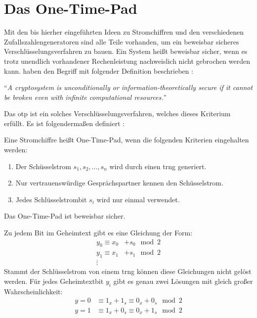\section{Das One-Time-Pad}
Mit den bis hierher eingeführten Ideen zu Stromchiffren und den verschiedenen
Zufallszahlengeneratoren sind alle Teile vorhanden, um ein beweisbar
sicheres Verschlüsselungsver\-fahren zu bauen. Ein System heißt beweisbar sicher,
wenn es trotz unendlich vorhandener Rechenleistung nachweislich nicht gebrochen werden kann.
\citeauthor{BOOK:crypto} haben den Begriff mit folgender Definition
beschrieben \parencite*[36]{BOOK:crypto}:

\begin{definition}
  \enquote{\textit{A cryptosystem is unconditionally or in\-formation-theoretically
      secure if it cannot be broken even with infinite computational resources.}}
\end{definition}

\noindent
Das \ac{otp} ist ein solches Verschlüsselungsverfahren, welches dieses Kriterium
erfüllt. Es ist folgendermaßen definiert \parencite[37]{BOOK:crypto}:

\begin{definition}
  Eine Stromchiffre heißt One-Time-Pad, wenn die folgenden Kriterien eingehalten werden:
  \begin{enumerate}
    \item Der Schüsselstrom $s_1,s_2,\dots,s_n$ wird durch einen \ac{trng} generiert.
    \item Nur vertrauenswürdige Gesprächspartner kennen den Schüsselstrom.
    \item Jedes Schlüsselstrombit $s_i$ wird nur einmal verwendet.
  \end{enumerate}
  Das One-Time-Pad ist beweisbar sicher.
\end{definition}
\noindent
Zu jedem Bit im Geheimtext gibt es eine Gleichung der Form:
\begin{align*}
  y_0   \equiv x_0 & + s_0 \mod{2} \\
  y_1   \equiv x_1 & + s_1 \mod{2} \\
  \vdots           &
\end{align*}
\noindent
Stammt der Schlüsselstrom von einem \ac{trng} können diese Gleichungen nicht gelöst werden.
Für jedes Geheimtextbit $y_i$ gibt es genau zwei Lösungen mit gleich großer Wahrscheinlichkeit:
\begin{align*}
  y = 0 & \equiv 1_x + 1_s \equiv 0_x + 0_s \mod{2} \\
  y = 1 & \equiv 1_x + 0_s \equiv 0_x + 1_s \mod{2}
\end{align*}

